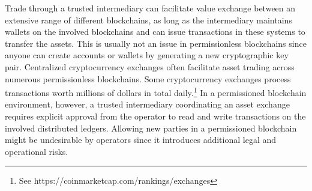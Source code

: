 Trade through a trusted intermediary can facilitate value exchange between an extensive range of different blockchains, as long as the intermediary maintains wallets on the involved blockchains and can issue transactions in these systems to transfer the assets.
This is usually not an issue in permissionless blockchains since anyone can create accounts or wallets by generating a new cryptographic key pair.
Centralized cryptocurrency exchanges often facilitate asset trading across numerous permissionless blockchains.
Some cryptocurrency exchanges process transactions worth millions of dollars in total daily.\footnote{See https://coinmarketcap.com/rankings/exchanges}
In a permissioned blockchain environment, however, a trusted intermediary coordinating an asset exchange requires explicit approval from the operator to read and write transactions on the involved distributed ledgers.
Allowing new parties in a permissioned blockchain might be undesirable by operators since it introduces additional legal and operational risks.

